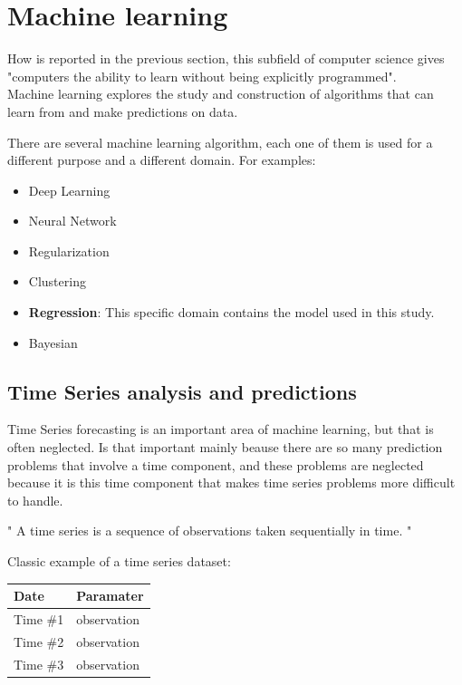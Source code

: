 \newpage


\section{Machine learning}
\vspace{-5mm}
\label{ML}
How is reported in the previous section, this subfield of computer science gives "computers the ability to learn without being explicitly programmed". \\
Machine learning explores the study and construction of algorithms that can learn from and make predictions on data.

There are several machine learning algorithm, each one of them is used for a different purpose and a different domain. For examples:
  \vspace{-5mm}
\begin{itemize}
 \setlength{\itemsep}{-5pt}
  \item Deep Learning
  \item Neural Network
  \item Regularization
  \item Clustering
  \item \textbf{Regression}: This specific domain contains the model used in this study.
  \item Bayesian
  
 \end{itemize}  

\subsection{Time Series analysis and predictions}
  \vspace{-5mm}
Time Series forecasting is an important area of machine learning, but that is often neglected. Is that important mainly beause there are so many prediction problems that involve a time component, and these problems are neglected because it is this time component that makes time series problems more difficult to handle.\cite{previousWork}

" A time series is a sequence of observations taken sequentially in time. "\cite{TimeSeries} 

Classic example of a time series dataset:

\begin{tabular}{ | l | l | }
\hline 		\textbf{Date}	&	\textbf{Paramater} \\ \hline
				Time \#1	&	observation \\ \hline	
				Time \#2	&	observation \\ \hline	
				Time \#3	&	observation \\ \hline											
\end{tabular}

